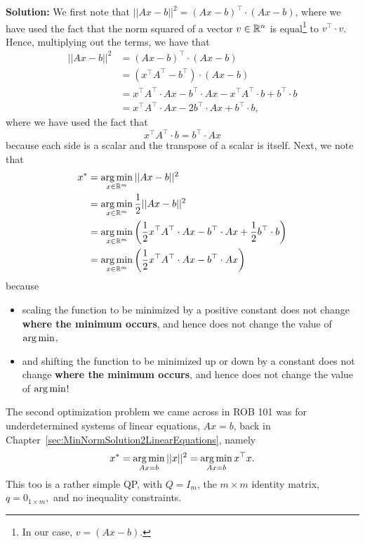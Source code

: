 \textbf{Solution:} We first note that $||Ax-b ||^2 = (Ax-b)^\top \cdot (Ax-b) $, 
where we have used the fact that the norm squared of a vector $v \in \mathbb R^n$ is equal\footnote{In our case, $v=(Ax-b)$.} to $v^\top \cdot v$. Hence, multiplying out the terms, we have that
\begin{equation}
    \label{eq:QP01d}
    \begin{aligned}
     ||Ax-b ||^2 & =  (Ax-b)^\top \cdot (Ax-b) \\
     &= \left(x^\top A^\top - b^\top \right) \cdot \left(Ax - b\right)\\
     &= x^\top A^\top \cdot A x -b^\top \cdot Ax -x^\top A^\top \cdot b + b^\top \cdot b \\
     &=x^\top A^\top \cdot A x - 2 b^\top \cdot Ax + b^\top \cdot b,  
     \end{aligned}
\end{equation}
where we have used the fact that $$ x^\top A^\top \cdot b = b^\top \cdot Ax $$
because each side is a scalar and the transpose of a scalar is itself. Next, we note that
\begin{align*}
 x^\ast &= \operatorname*{arg\,min}_{x \in \mathbb R^m} ||Ax-b ||^2 \\
  &= \operatorname*{arg\,min}_{x \in \mathbb R^m} \frac{1}{2}||Ax-b ||^2\\
  & = \operatorname*{arg\,min}_{x \in \mathbb R^m}\left( \frac{1}{2} x^\top A^\top \cdot A x -  b^\top \cdot Ax + \frac{1}{2} b^\top \cdot b \right)\\
   & = \operatorname*{arg\,min}_{x \in \mathbb R^m} \left(\frac{1}{2} x^\top A^\top \cdot A x -  b^\top \cdot Ax \right)
\end{align*}
because
\begin{itemize}
    \item scaling the function to be minimized by a positive constant does not change \textbf{where the minimum occurs}, and hence does not change the value of $\operatorname*{arg\,min}$, 
    \item and shifting the function to be minimized up or down by a constant does not change \textbf{where the minimum occurs}, and hence does not change the value of $\operatorname*{arg\,min}$!
\end{itemize}
\Qed


\begin{example}
\label{ex:UnderdeterminedQP}
The second optimization problem we came across in ROB 101 was for underdetermined systems of linear equations, $Ax=b$, back in Chapter~\ref{sec:MinNormSolution2LinearEquations}, namely 
\begin{equation}
    \label{eq:QP02}
    x^\ast = \operatorname*{arg\,min}_{Ax=b} ||x ||^2 = \operatorname*{arg\,min}_{Ax=b} x^\top x. 
\end{equation}
This too is a rather simple QP, with $Q = I_m$, the $m \times m$ identity matrix, $q= 0_{1 \times m},$ and no inequality constraints.
\end{example}
\Qed

